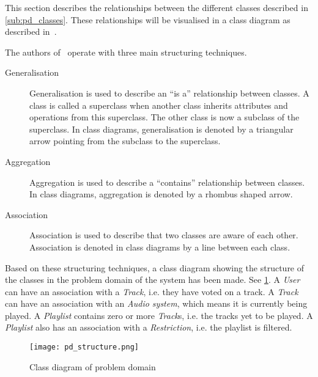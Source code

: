 This section describes the relationships between the different classes
described in \cref{sub:pd_classes}. These relationships will be
visualised in a class diagram as described
in~\cite{mathiassen2001objektorienteret}.

The authors of~\cite{mathiassen2001objektorienteret} operate with three
main structuring techniques.

\begin{description}
\item[Generalisation] Generalisation is used to describe an \enquote{is a}
  relationship between classes. A class is called a
  superclass when another class inherits attributes and operations
  from this superclass. The other class is now a subclass of the
  superclass. In class diagrams, generalisation is denoted by a
  triangular arrow pointing from the subclass to the superclass.
\item[Aggregation] Aggregation is used to describe a
  \enquote{contains} relationship between classes. In class diagrams,
  aggregation is denoted by a rhombus shaped arrow.
\item[Association] Association is used to describe that two classes
  are aware of each other. Association is denoted in class diagrams by
  a line between each class.
\end{description} 

Based on these structuring techniques, a class diagram showing the structure of the classes in the problem domain of the system has been made. See \cref{fig:pd_structure}. A \textit{User} can have an association with a \textit{Track}, i.e. they have voted on a track. A \textit{Track} can have an association with an \textit{Audio system}, which means it is currently being played. A \textit{Playlist} contains zero or more \textit{Track}s, i.e. the tracks yet to be played. A \textit{Playlist} also has an association with a \textit{Restriction}, i.e. the playlist is filtered.

\begin{figure}
  \centering
  \texttt{[image: pd\_structure.png]}
  \caption{Class diagram of problem domain}\label{fig:pd_structure}
\end{figure}
